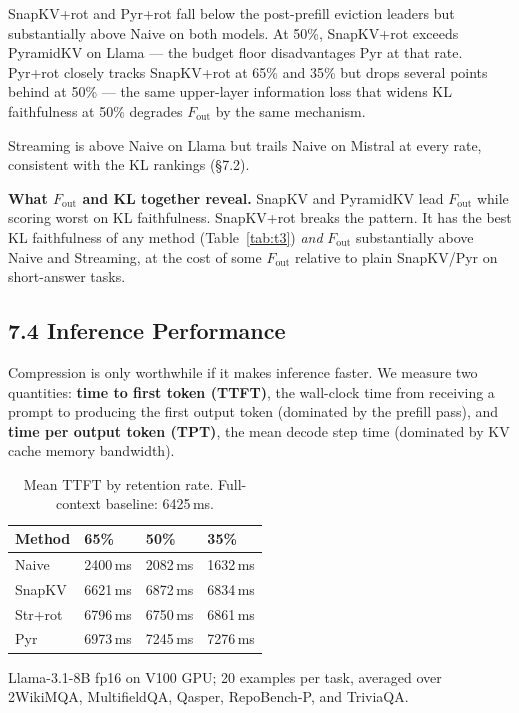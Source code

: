 \documentclass[10pt,letterpaper]{article}
\begin{document}
SnapKV+rot and Pyr+rot fall below the post-prefill eviction leaders but
substantially above Naive on both models.
At 50\%, SnapKV+rot exceeds PyramidKV on Llama --- the budget
floor disadvantages Pyr at that rate. Pyr+rot closely tracks SnapKV+rot
at 65\% and 35\% but drops several points behind at 50\% --- the same
upper-layer information loss that widens KL faithfulness at 50\%
degrades \(F_{\text{out}}\) by the same mechanism.

Streaming is above Naive on Llama but trails Naive on Mistral at every
rate, consistent with the KL rankings (§7.2).

\textbf{What \(F_{\text{out}}\) and KL together reveal.} SnapKV and
PyramidKV lead \(F_{\text{out}}\) while scoring worst on KL faithfulness.
SnapKV+rot breaks the pattern. It has the best KL faithfulness of any
method (Table~\ref{tab:t3}) \emph{and} \(F_{\text{out}}\) substantially above Naive
and Streaming, at the cost of some \(F_{\text{out}}\) relative to plain
SnapKV/Pyr on short-answer tasks.

\hypertarget{inference-performance}{%
\subsection{7.4 Inference Performance}\label{inference-performance}}

Compression is only worthwhile if it makes inference faster. We measure
two quantities: \textbf{time to first token (TTFT)}, the wall-clock time
from receiving a prompt to producing the first output token (dominated
by the prefill pass), and \textbf{time per output token (TPT)}, the mean
decode step time (dominated by KV cache memory bandwidth). 

\begin{table}[H]
\centering
\small
\caption{Mean TTFT by retention rate. Full-context baseline: 6425\,ms.}
\label{tab:ttft}
\begin{tabular}{@{}llll@{}}
\toprule
Method & 65\% & 50\% & 35\%\\
\midrule
Naive     & 2400\,ms & 2082\,ms & 1632\,ms\\
SnapKV    & 6621\,ms & 6872\,ms & 6834\,ms\\
Str+rot   & 6796\,ms & 6750\,ms & 6861\,ms\\
Pyr       & 6973\,ms & 7245\,ms & 7276\,ms\\
\bottomrule
\end{tabular}
\center
Llama-3.1-8B fp16 on V100 GPU; 20 examples per task, averaged over\\2WikiMQA, MultifieldQA, Qasper, RepoBench-P, and TriviaQA.
\end{table}
\end{document}
